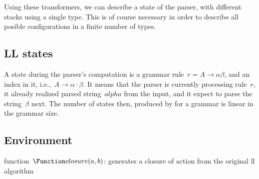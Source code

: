 Using these transformers, we can describe a state of the parser,
  with different stacks using a single type.
This is of course necessary in order to describe all posible configurations
  in a finite number of \Java types.

%
\subsection{LL states}
A state during the parser's computation is a grammar rule~$r = A→αβ$, and an
index in it, i.e.,~$A→α·β$.
It means that the parser is currently processing rule~$r$, it already realized parsed string~$alpha$
  from the input, and it expect to parse the string~$β$ next.
The number of states then, produced by \Fajita for a grammar is linear in the grammar size.

\subsection{Environment}

\begin{algorithm}[p]
  \caption{\label{algorithm:llclosure}
  function~$\Function closure(a,b)$: generates a closure of action from the original ll algorithm}
  \begin{algorithmic}
    \FI
      \ELSE[$x$ must be~$b$]
        \BREAK
      \FI
    \DONE
  \end{algorithmic}
\end{algorithm}

\endinput

